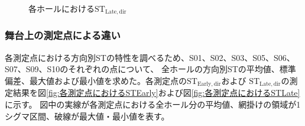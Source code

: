 \documentclass[11pt,a4j]{jreport}
\begin{document}
\begin{figure}[H]
    \caption{各ホールにおける$\mathrm{ST_{Late,dir}}$}
    \label{fig:各ホールにおけるSTLate}
    \end{figure}



    \subsubsection{舞台上の測定点による違い}

    各測定点における方向別STの特性を調べるため、S01、S02、S03、S05、S06、S07、S09、S10のそれぞれの点について、
    全ホールの方向別STの平均値、標準偏差、最大値および最小値を求めた。各測定点の$\mathrm{ST_{Early,dir}}$および
    $\mathrm{ST_{Late,dir}}$の測定結果を図\ref{fig:各測定点におけるSTEarly}および図\ref{fig:各測定点におけるSTLate}に示す。
    図中の実線が各測定点における全ホール分の平均値、網掛けの領域が1シグマ区間、破線が最大値・最小値を表す。
\end{document}
